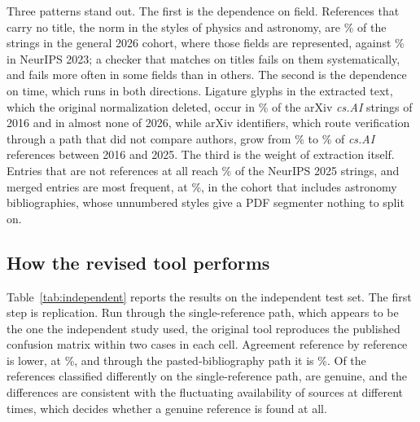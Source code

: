\documentclass[pdflatex,sn-apa]{sn-jnl}
\begin{document}
Three patterns stand out. The first is the dependence on field. References that carry no title, the norm in the styles of physics and astronomy, are \FeatNoTitleGen{}\% of the strings in the general 2026 cohort, where those fields are represented, against \FeatNoTitleNipsTwentythree{}\% in NeurIPS 2023; a checker that matches on titles fails on them systematically, and fails more often in some fields than in others. The second is the dependence on time, which runs in both directions. Ligature glyphs in the extracted text, which the original normalization deleted, occur in \FeatLigCsSixteen{}\% of the arXiv \textit{cs.AI} strings of 2016 and in almost none of 2026, while arXiv identifiers, which route verification through a path that did not compare authors, grow from \FeatArxivCsSixteen{}\% to \FeatArxivCsTwentyfive{}\% of \textit{cs.AI} references between 2016 and 2025. The third is the weight of extraction itself. Entries that are not references at all reach \FeatNotRefNipsTwentyfive{}\% of the NeurIPS 2025 strings, and merged entries are most frequent, at \FeatMergedGen{}\%, in the cohort that includes astronomy bibliographies, whose unnumbered styles give a PDF segmenter nothing to split on.

\subsection{How the revised tool performs}
\label{sec:performance}

Table~\ref{tab:independent} reports the results on the independent test set. The first step is replication. Run through the single-reference path, which appears to be the one the independent study used, the original tool reproduces the published confusion matrix within two cases in each cell. Agreement reference by reference is lower, at \IndAgreeQuick{}\%, and through the pasted-bibliography path it is \IndAgreePaste{}\%. Of the \IndDisQuick{} references classified differently on the single-reference path, \IndDisQuickGen{} are genuine, and the differences are consistent with the fluctuating availability of sources at different times, which decides whether a genuine reference is found at all.

\begin{table}[htbp]
\centering
\caption{Independent test set of \citet{badalova2026data}: \IndProb{} problematic and \IndGen{} genuine references. A reference is flagged when the tool reports anything other than Verified. Published results are those of \citet{badalova2026}.}
\label{tab:independent}
\vspace{4pt}
\footnotesize
\setlength{\tabcolsep}{3.5pt}

\end{table}
\end{document}
